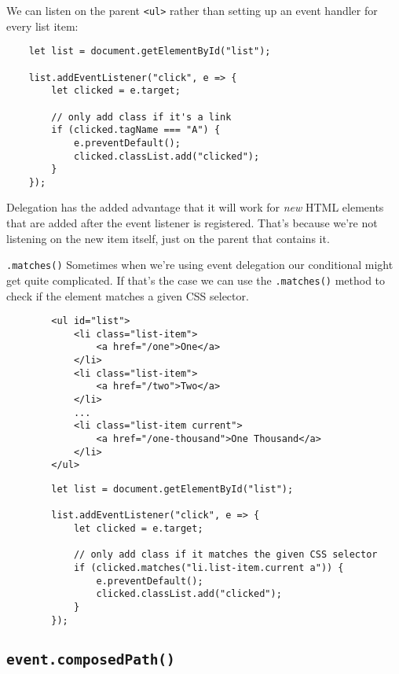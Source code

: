 We can listen on the parent \texttt{<ul>} rather than setting up an event handler for every list item:

\begin{verbatim}
    let list = document.getElementById("list");

    list.addEventListener("click", e => {
        let clicked = e.target;

        // only add class if it's a link
        if (clicked.tagName === "A") {
            e.preventDefault();
            clicked.classList.add("clicked");
        }
    });
\end{verbatim}

Delegation has the added advantage that it will work for \textit{new} HTML elements that are added after the event listener is registered. That's because we're not listening on the new item itself, just on the parent that contains it.

\pagebreak

\begin{infobox}{\texttt{.matches()}}
    Sometimes when we're using event delegation our conditional might get quite complicated. If that's the case we can use the \texttt{.matches()} method to check if the element matches a given CSS selector.

    \begin{verbatim}
        <ul id="list">
            <li class="list-item">
                <a href="/one">One</a>
            </li>
            <li class="list-item">
                <a href="/two">Two</a>
            </li>
            ...
            <li class="list-item current">
                <a href="/one-thousand">One Thousand</a>
            </li>
        </ul>
    \end{verbatim}

    \begin{verbatim}
        let list = document.getElementById("list");

        list.addEventListener("click", e => {
            let clicked = e.target;

            // only add class if it matches the given CSS selector
            if (clicked.matches("li.list-item.current a")) {
                e.preventDefault();
                clicked.classList.add("clicked");
            }
        });
    \end{verbatim}
\end{infobox}

\pagebreak

\subsection{\texttt{event.composedPath()}}

